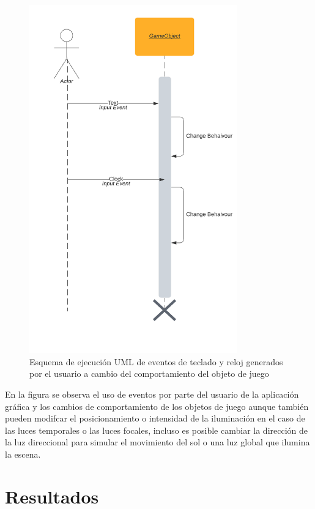 \documentclass[a4paper]{book}
\begin{document}
\begin{figure}[H]
    \centering
    \includegraphics[width=9cm, keepaspectratio]{img/UserEvent.png}
    \caption{Esquema de ejecución UML de eventos de teclado y reloj generados por el usuario a cambio del comportamiento del objeto de juego}
    \label{UserEvent}
\end{figure}

En la figura se observa el uso de eventos por parte del usuario de la aplicación gráfica y los cambios de comportamiento de los objetos de juego
aunque también pueden modifcar el posicionamiento o intensidad de la iluminación en el caso de las luces temporales o las luces focales, 
incluso es posible cambiar la dirección de la luz direccional para simular el movimiento del sol o una luz global que ilumina la escena.


\cleardoublepage
\chapter{Resultados}
\end{document}
